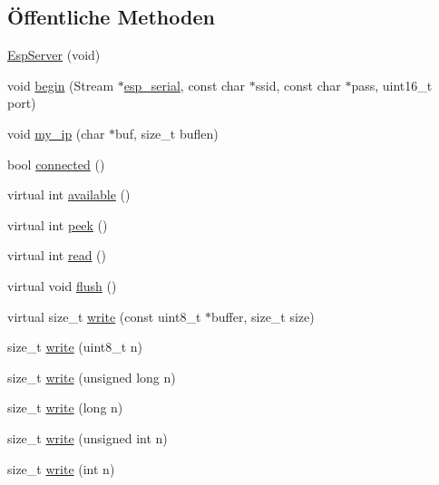 \subsection*{Öffentliche Methoden}
\begin{DoxyCompactItemize}
\item 
\hyperlink{class_esp_server_aa852bdd3db81410e2b71cafa8adb5c79}{Esp\+Server} (void)
\item 
void \hyperlink{class_esp_server_a1d8682ca0934af03639311e23a71283f}{begin} (Stream $\ast$\hyperlink{_arduino__kommentiert_8ino_af690b3a6882292855c4091ede8039998}{esp\+\_\+serial}, const char $\ast$ssid, const char $\ast$pass, uint16\+\_\+t port)
\item 
void \hyperlink{class_esp_server_a01953c4cc039c37f94dc3e1057126abb}{my\+\_\+ip} (char $\ast$buf, size\+\_\+t buflen)
\item 
bool \hyperlink{class_esp_server_a59fc494d53391b27e2fd75cb750690d9}{connected} ()
\item 
virtual int \hyperlink{class_esp_server_a4549a76725f2e4c013e4d57018366109}{available} ()
\item 
virtual int \hyperlink{class_esp_server_a9040fa1d479d71edf3a826f4691c35c4}{peek} ()
\item 
virtual int \hyperlink{class_esp_server_aaab5dab5b969a87f538242e524431637}{read} ()
\item 
virtual void \hyperlink{class_esp_server_adac116554b543b7c4228c018a85882f5}{flush} ()
\item 
virtual size\+\_\+t \hyperlink{class_esp_server_a7c66fc8d559f4956d4ccea196299bca7}{write} (const uint8\+\_\+t $\ast$buffer, size\+\_\+t size)
\item 
size\+\_\+t \hyperlink{class_esp_server_af32c245c813bbadb566538bba418b0fe}{write} (uint8\+\_\+t n)
\item 
size\+\_\+t \hyperlink{class_esp_server_a0ba52a995edf9b6c2cdf3d396be84ff1}{write} (unsigned long n)
\item 
size\+\_\+t \hyperlink{class_esp_server_a3cfec102ee6f58a2f7e617999ce9f5bb}{write} (long n)
\item 
size\+\_\+t \hyperlink{class_esp_server_a2d9bc6ac05e45a7023be3cd1ca224407}{write} (unsigned int n)
\item 
size\+\_\+t \hyperlink{class_esp_server_a22e7ab55e0aa268cff5b48e763429ec3}{write} (int n)
\end{DoxyCompactItemize}
